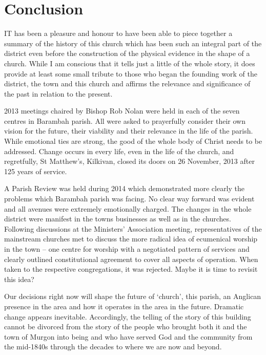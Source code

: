 \printendnotes[custom]
\setcounter{endnote}{0}
\chapter{Conclusion}
\nobalance


\lettrine[lines=3]{I}{T}
 has been a pleasure and honour to have been able to piece together a summary of the history of this church which has been such an integral part of the district even before the construction of the physical evidence in the shape of a church. While I am conscious that it tells just a little of the whole story, it does provide at least some small tribute to those who began the founding work of the district, the town and this church and affirms the relevance and significance of the past in relation to the present.

2013 meetings chaired by Bishop Rob Nolan were held in each of the seven centres in Barambah parish. All were asked to prayerfully consider their own vision for the future, their viability and their relevance in the life of the parish. While emotional ties are strong, the good of the whole body of Christ needs to be addressed. Change occurs in every life, even in the life of the church, and regretfully, St Matthew's, Kilkivan, closed its doors on 26 November, 2013 after 125 years of service.



A Parish Review was held during 2014 which demonstrated more clearly the problems which Barambah parish was facing. No clear way forward was evident and all avenues were extremely emotionally charged. The changes in the whole district were manifest in the towns businesses as well as in the churches. Following discussions at the Ministers' Association meeting, representatives of the mainstream churches met to discuss the more radical idea of ecumenical worship in the town -- one centre for worship with a negotiated pattern of services and clearly outlined constitutional agreement to cover all aspects of operation. When taken to the respective congregations, it was rejected. Maybe it is time to revisit this idea?



Our decisions right now will shape the future of `church', this parish, an Anglican presence in the area and how it operates in the area in the future. Dramatic change appears inevitable. Accordingly, the telling of the story of this building cannot be divorced from the story of the people who brought both it and the town of Murgon into being and who have served God and the community from the mid-1840s through the decades to where we are now and beyond.



